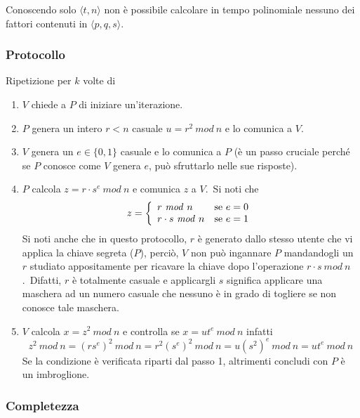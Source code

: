 Conoscendo solo $\langle t, n\rangle$ non è possibile calcolare in tempo polinomiale nessuno dei fattori contenuti in $\langle p, q, s\rangle$.\

\subsubsection{Protocollo}

Ripetizione per $k$ volte di

\begin{enumerate}
    \item $V$ chiede a $P$ di iniziare un'iterazione.
    \item $P$ genera un intero $r < n$ casuale $u = r^2\ \mathit{mod}\ n$ e lo comunica a $V$.
    \item $V$ genera un $e \in \{0, 1\}$ casuale e lo comunica a $P$ (è un passo cruciale perché se $P$ conosce come $V$ genera $e$, può sfruttarlo nelle sue risposte).
    \item $P$ calcola $z = r\cdot s^e\ \mathit{mod}\ n$ e comunica $z$ a $V$.\ Si noti che
          \[z = \left\{\begin{array}{l l}
                  r\ \mathit{mod}\ n        & \mathrm{se}\ e = 0 \\
                  r\cdot s\ \mathit{mod}\ n & \mathrm{se}\ e = 1 \\
              \end{array}\right.\]
          Si noti anche che in questo protocollo, $r$ è generato dallo stesso utente che vi applica la chiave segreta ($P$), perciò, $V$ non può ingannare $P$ mandandogli un $r$ studiato appositamente per ricavare la chiave dopo l'operazione $r\cdot s\ \mathit{mod}\ n$.\ Difatti, $r$ è totalmente casuale e applicargli $s$ significa applicare una maschera ad un numero casuale che nessuno è in grado di togliere se non conosce tale maschera.
    \item $V$ calcola $x = z^2\ \mathit{mod}\ n$ e controlla se $x = ut^e\ \mathit{mod}\ n$ infatti
          \[z^2\ \mathit{mod}\ n = (rs^e)^2\ \mathit{mod}\ n = r^2 (s^e)^2\ \mathit{mod}\ n  = u(s^2)^e\ \mathit{mod}\ n = ut^e\ \mathit{mod}\ n\]
          Se la condizione è verificata riparti dal passo 1, altrimenti concludi con $P$ è un imbroglione.
\end{enumerate}

\subsubsection{Completezza}

